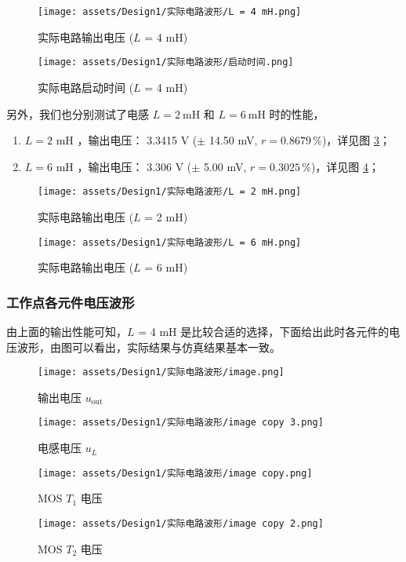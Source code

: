 \documentclass[UTF8]{article}
\theoremstyle{MyLineTheoremStyle} %
\theoremstyle{MyBlockTheoremStyle} %
\theoremstyle{MySubsubsectionStyle} %
\begin{document}
\begin{figure}[H]\centering
    \texttt{[image: assets/Design1/实际电路波形/L = 4 mH.png]}
    \caption{实际电路输出电压 ($L$ = 4 mH)}
    \label{实际电路输出电压 4 mH}
\end{figure}
\begin{figure}[H]\centering
    \texttt{[image: assets/Design1/实际电路波形/启动时间.png]}
    \caption{实际电路启动时间 ($L$ = 4 mH)}
    \label{实际电路启动时间 4 mH}
\end{figure}


另外，我们也分别测试了电感 $L = 2 \ \mathrm{mH}$ 和 $L = 6 \ \mathrm{mH}$ 时的性能，
\begin{enumerate}
\item $L = 2$ mH ，输出电压： 3.3415 V ($\pm$ 14.50 mV, $r = 0.8679 \,\%$)，详见图 \ref{实际电路输出电压 2 mH}；
\item $L = 6$ mH ，输出电压： 3.306 V ($\pm$ 5.00 mV, $r = 0.3025 \,\%$)，详见图 \ref{实际电路输出电压 6 mH}；
\end{enumerate}


\begin{figure}[H]\centering
    \texttt{[image: assets/Design1/实际电路波形/L = 2 mH.png]}
    \caption{实际电路输出电压 ($L$ = 2 mH)}
    \label{实际电路输出电压 2 mH}
\end{figure}
\begin{figure}[H]\centering
    \texttt{[image: assets/Design1/实际电路波形/L = 6 mH.png]}
    \caption{实际电路输出电压 ($L$ = 6 mH)}
    \label{实际电路输出电压 6 mH}
\end{figure}

\subsubsection{工作点各元件电压波形}
由上面的输出性能可知，$L$ = 4 mH 是比较合适的选择，下面给出此时各元件的电压波形，由图可以看出，实际结果与仿真结果基本一致。
\begin{figure}[H]\centering
    \texttt{[image: assets/Design1/实际电路波形/image.png]}
    \caption{输出电压 $u_{\text{out}}$}
\end{figure}
\begin{figure}[H]\centering
    \texttt{[image: assets/Design1/实际电路波形/image copy 3.png]}
    \caption{电感电压 $u_L$}
\end{figure}
\begin{figure}[H]\centering
    \texttt{[image: assets/Design1/实际电路波形/image copy.png]}
    \caption{MOS $T_1$ 电压}
\end{figure}
\begin{figure}[H]\centering
    \texttt{[image: assets/Design1/实际电路波形/image copy 2.png]}
    \caption{MOS $T_2$ 电压}
\end{figure}
\end{document}
